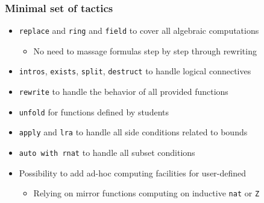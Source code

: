 \documentclass[compress]{beamer}
\begin{document}
\begin{frame}
\frametitle{Minimal set of tactics}
\begin{itemize}
\item {\tt replace} and {\tt ring} and {\tt field}
to cover all algebraic computations
\begin{itemize}
\item No need to massage formulas step by step through rewriting
\end{itemize}
\item {\tt intros}, {\tt exists}, {\tt split}, {\tt destruct} to handle
  logical connectives
\item {\tt rewrite} to handle the behavior of all provided functions
\item {\tt unfold} for functions defined by students
\item {\tt apply} and {\tt lra} to handle all side conditions related to bounds
\item {\tt auto with rnat} to handle all subset conditions
\item Possibility to add ad-hoc computing facilities for user-defined
\begin{itemize}
\item Relying on mirror functions computing on inductive {\tt nat} or {\tt Z}
\end{itemize}
\end{itemize}
\end{frame}
\end{document}
